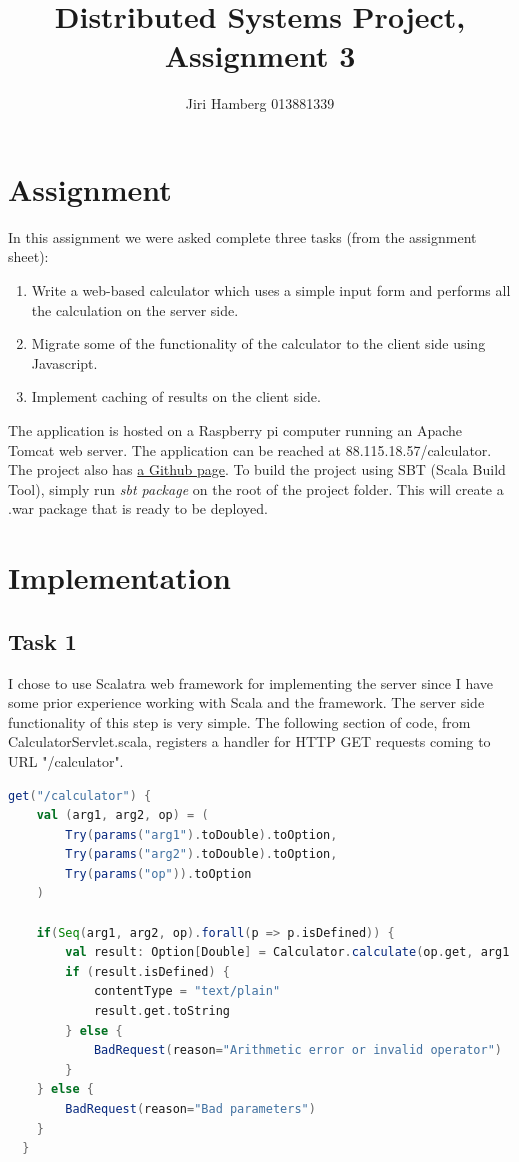 \documentclass[12pt]{article}
\author{Jiri Hamberg 013881339}
\title{Distributed Systems Project, Assignment 3}
\begin{document}
\maketitle


\section{ Assignment }

In this assignment we were asked complete three tasks (from the assignment sheet):

\begin{enumerate}

	\item Write	 a	 web-based	 calculator	 which	 uses	 a	 simple	 input	 form	 and	
performs	all	the	calculation	on	the	server	side.
	\item Migrate	some	of	the	functionality	of	the	calculator	to	the	client	side	using	
Javascript.
	\item Implement	caching	of	results	on	the	client	side. 
\end{enumerate}

The application is hosted on a Raspberry pi computer running an Apache Tomcat web server. The application can be reached at 88.115.18.57/calculator. The project also has \href{https://github.com/JiriHamberg/DistSysProj_calculator}{a Github page}. To build the project using SBT (Scala Build Tool), simply run \textit{sbt package} on the root of the project folder. This will create a .war package that is ready to be deployed.

\section{ Implementation }

\subsection*{Task 1}

I chose to use Scalatra web framework for implementing the server since I have some prior experience working with Scala and the framework. The server side functionality of this step is very simple. The following section of code, from CalculatorServlet.scala, registers a handler for HTTP GET requests coming to URL "/calculator". 

\begin{lstlisting}[language=scala]
  get("/calculator") {
  	val (arg1, arg2, op) = (
  		Try(params("arg1").toDouble).toOption,
  		Try(params("arg2").toDouble).toOption,
  		Try(params("op")).toOption
	)

	if(Seq(arg1, arg2, op).forall(p => p.isDefined)) {
		val result: Option[Double] = Calculator.calculate(op.get, arg1.get, arg2.get)
		if (result.isDefined) {
			contentType = "text/plain"
			result.get.toString
		} else {
			BadRequest(reason="Arithmetic error or invalid operator")
		}
	} else {
		BadRequest(reason="Bad parameters")
	} 	
  }    
\end{lstlisting}
\end{document}
